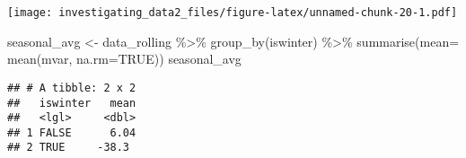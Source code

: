 \documentclass[
]{article}
\newenvironment{Shaded}{\begin{snugshade}}{\end{snugshade}}
\newcommand{\AttributeTok}[1]{\textcolor[rgb]{0.77,0.63,0.00}{#1}}
\newcommand{\ConstantTok}[1]{\textcolor[rgb]{0.00,0.00,0.00}{#1}}
\newcommand{\FunctionTok}[1]{\textcolor[rgb]{0.00,0.00,0.00}{#1}}
\newcommand{\NormalTok}[1]{#1}
\newcommand{\OtherTok}[1]{\textcolor[rgb]{0.56,0.35,0.01}{#1}}
\newcommand{\SpecialCharTok}[1]{\textcolor[rgb]{0.00,0.00,0.00}{#1}}
\begin{document}
\texttt{[image: investigating\_data2\_files/figure-latex/unnamed-chunk-20-1.pdf]}

\begin{Shaded}
\begin{Highlighting}[]
\NormalTok{seasonal\_avg }\OtherTok{\textless{}{-}}\NormalTok{ data\_rolling }\SpecialCharTok{\%\textgreater{}\%}
  \FunctionTok{group\_by}\NormalTok{(iswinter) }\SpecialCharTok{\%\textgreater{}\%} 
  \FunctionTok{summarise}\NormalTok{(}\AttributeTok{mean=} \FunctionTok{mean}\NormalTok{(mvar, }\AttributeTok{na.rm=}\ConstantTok{TRUE}\NormalTok{))}
\NormalTok{seasonal\_avg}
\end{Highlighting}
\end{Shaded}

\begin{verbatim}
## # A tibble: 2 x 2
##   iswinter   mean
##   <lgl>     <dbl>
## 1 FALSE      6.04
## 2 TRUE     -38.3
\end{verbatim}
\end{document}
